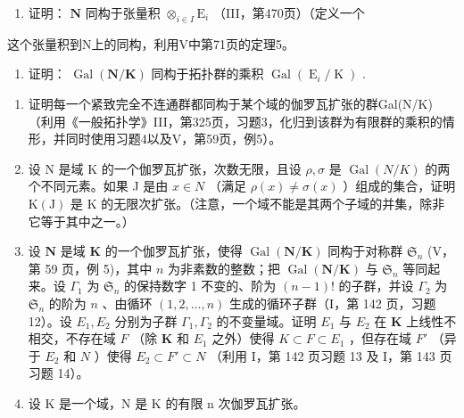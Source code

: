 \begin{enumerate}
\def\labelenumi{\alph{enumi})}
\tightlist
\item
  证明： \(\mathbf{N}\) 同构于张量积 \(\otimes_{i\in I}\mathrm{E}_i\) （III，第470页）（定义一个
\end{enumerate}

这个张量积到N上的同构，利用V中第71页的定理5。

\begin{enumerate}
\def\labelenumi{\alph{enumi})}
\setcounter{enumi}{1}
\tightlist
\item
  证明： \(\operatorname{Gal}(\mathbf{N}/\mathbf{K})\) 同构于拓扑群的乘积 \(\operatorname{Gal}(\operatorname{E}_{i}/\operatorname{K})\) .
\end{enumerate}

\begin{enumerate}
\def\labelenumi{\arabic{enumi})}
\setcounter{enumi}{4}
\item
  证明每一个紧致完全不连通群都同构于某个域的伽罗瓦扩张的群Gal(N/K)（利用《一般拓扑学》III，第325页，习题3，化归到该群为有限群的乘积的情形，并同时使用习题4以及V，第59页，例5）。
\item
  设 N 是域 K 的一个伽罗瓦扩张，次数无限，且设 \(\rho, \sigma\) 是 \(\operatorname{Gal}(N/K)\) 的两个不同元素。如果 J 是由 \(x \in N\) （满足 \(\rho(x) \neq \sigma(x)\) ）组成的集合，证明 \(\mathrm{K}(\mathrm{J})\) 是 K 的无限次扩张。（注意，一个域不能是其两个子域的并集，除非它等于其中之一。）
\item
  设 \(\mathbf{N}\) 是域 \(\mathbf{K}\) 的一个伽罗瓦扩张，使得 \(\operatorname{Gal}(\mathbf{N} / \mathbf{K})\) 同构于对称群 \(\mathfrak{S}_n\) (V，第 59 页，例 5)，其中 \(n\) 为非素数的整数；把 \(\operatorname{Gal}(\mathbf{N} / \mathbf{K})\) 与 \(\mathfrak{S}_n\) 等同起来。设 \(\Gamma_1\) 为 \(\mathfrak{S}_n\) 的保持数字 1 不变的、阶为 \((n - 1)!\) 的子群，并设 \(\Gamma_2\) 为 \(\mathfrak{S}_n\) 的阶为 \(n\) 、由循环 \((1, 2, \ldots, n)\) 生成的循环子群（I，第 142 页，习题 12）。设 \(E_1, E_2\) 分别为子群 \(\Gamma_1, \Gamma_2\) 的不变量域。证明 \(E_1\) 与 \(E_2\) 在 \(\mathbf{K}\) 上线性不相交，不存在域 \(F\) （除 \(\mathbf{K}\) 和 \(E_1\) 之外）使得 \(K \subset F \subset E_1\) ，但存在域 \(F'\) （异于 \(E_2\) 和 \(N\) ）使得 \(E_2 \subset F' \subset N\) （利用 I，第 142 页习题 13 及 I，第 143 页习题 14）。
\item
  设 K 是一个域，N 是 K 的有限 n 次伽罗瓦扩张。
\end{enumerate}

